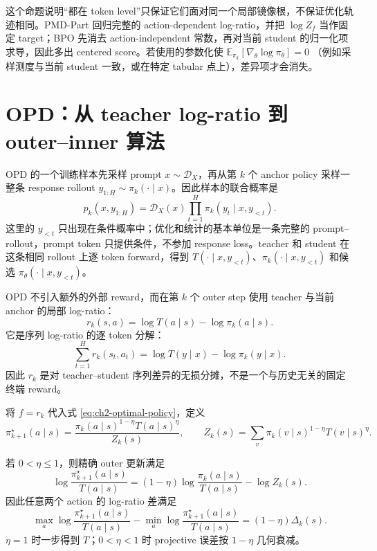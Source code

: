 这个命题说明“都在 token level”只保证它们面对同一个局部镜像根，不保证优化轨迹相同。PMD-Part 回归完整的 action-dependent log-ratio，并把 $\log Z_f$ 当作固定 target；BPO 先消去 action-independent 常数，再对当前 student 的归一化项求导，因此多出 centered score。若使用的参数化使
$\mathbb E_{\pi_k}[\nabla_\theta\log\pi_\theta]=0$
（例如采样测度与当前 student 一致，或在特定 tabular 点上），差异项才会消失。

\section{OPD：从 teacher log-ratio 到 outer--inner 算法}
\label{sec:ch2-opd-instantiation}

OPD 的一个训练样本先采样 prompt $x\sim\mathcal D_X$，再从第 $k$ 个 anchor policy 采样一整条 response rollout
$y_{1:H}\sim\pi_k(\cdot\mid x)$。因此样本的联合概率是
\[
 p_k(x,y_{1:H})=\mathcal D_X(x)\prod_{t=1}^{H}
 \pi_k(y_t\mid x,y_{<t}).
\]
这里的 $y_{<t}$ 只出现在条件概率中；优化和统计的基本单位是一条完整的 prompt--rollout，prompt token 只提供条件，不参加 response loss。teacher 和 student 在这条相同 rollout 上逐 token forward，得到
$T(\cdot\mid x,y_{<t})$、$\pi_k(\cdot\mid x,y_{<t})$ 和候选
$\pi_\theta(\cdot\mid x,y_{<t})$。

OPD 不引入额外的外部 reward，而在第 $k$ 个 outer step 使用 teacher 与当前 anchor 的局部 log-ratio：
\begin{equation}
\label{eq:ch2-opd-current-reward}
r_k(s,a)=\log T(a\mid s)-\log\pi_k(a\mid s).
\end{equation}
它是序列 log-ratio 的逐 token 分解：
\begin{equation}
\label{eq:ch2-opd-sequence-telescope}
\sum_{t=1}^{H}r_k(s_t,a_t)
=\log T(y\mid x)-\log\pi_k(y\mid x).
\end{equation}
因此 $r_k$ 是对 teacher--student 序列差异的无损分摊，不是一个与历史无关的固定终端 reward。

\begin{definition}
\label{def:ch2-opd-target}
将 $f=r_k$ 代入式 \eqref{eq:ch2-optimal-policy}，定义
\begin{equation}
\label{eq:ch2-opd-geometric-bridge}
\pi_{k+1}^{\star}(a\mid s)
=\frac{\pi_k(a\mid s)^{1-\eta}T(a\mid s)^\eta}{Z_k(s)},
\qquad
Z_k(s)=\sum_v\pi_k(v\mid s)^{1-\eta}T(v\mid s)^\eta.
\end{equation}
\end{definition}

\begin{theorem}
\label{thm:ch2-opd-geometric-bridge}
若 $0<\eta\leq1$，则精确 outer 更新满足
\begin{equation}
\label{eq:ch2-opd-projective-contraction}
\log\frac{\pi_{k+1}^{\star}(a\mid s)}{T(a\mid s)}
=(1-\eta)\log\frac{\pi_k(a\mid s)}{T(a\mid s)}-\log Z_k(s).
\end{equation}
因此任意两个 action 的 log-ratio 差满足
\[
\max_a\log\frac{\pi_{k+1}^{\star}(a\mid s)}{T(a\mid s)}
-\min_a\log\frac{\pi_{k+1}^{\star}(a\mid s)}{T(a\mid s)}
=(1-\eta)\Delta_k(s).
\]
$\eta=1$ 时一步得到 $T$；$0<\eta<1$ 时 projective 误差按 $1-\eta$ 几何衰减。
\end{theorem}

